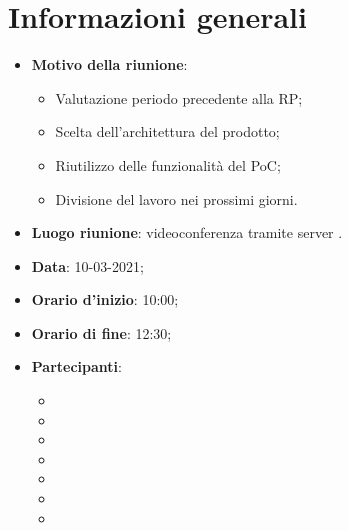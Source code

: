 \section{Informazioni generali}
\begin{itemize}
\item \textbf{Motivo della riunione}: 
\begin{itemize}
\item Valutazione periodo precedente alla RP;
\item Scelta dell'architettura del prodotto;
\item Riutilizzo delle funzionalità del PoC;
\item Divisione del lavoro nei prossimi giorni.
\end{itemize}
\item \textbf{Luogo riunione}: videoconferenza tramite server .
\item \textbf{Data}: 10-03-2021;
\item \textbf{Orario d'inizio}: 10:00;
\item \textbf{Orario di fine}: 12:30;
\item \textbf{Partecipanti}:
	\begin{itemize}
	\item \BM{}
	\item \SG{}
	\item \SP{}
	\item \SH{}
	\item \PA{}
	\item \ZM{}
	\item \RA{}
	\end{itemize}
\end{itemize}

\newpage
